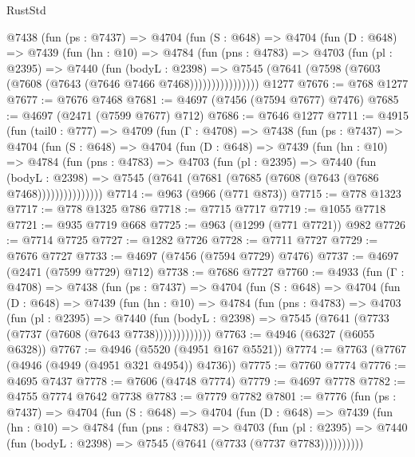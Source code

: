 \begin{lexlean}{RustStd}
\begin{coremodule}
        @7438
          (fun (ps : @7437) =>
          @4704
            (fun (S : @648) =>
            @4704
              (fun (D : @648) =>
              @7439
                (fun (hn : @10) =>
                @4784
                  (fun (pns : @4783) =>
                  @4703
                    (fun (pl : @2395) =>
                    @7440
                      (fun (bodyL : @2398) =>
                      @7545 (@7641 (@7598 (@7603 (@7608 (@7643 (@7646 @7466 @7468))))))))))))))))
    @1277
@7676 := @768 @1277
@7677 := @7676 @7468
@7681 := @4697 (@7456 (@7594 @7677) @7476)
@7685 := @4697 (@2471 (@7599 @7677) @712)
@7686 := @7646 @1277
@7711 := @4915
    (fun (tail0 : @777) =>
    @4709
      (fun (Γ : @4708) =>
      @7438
        (fun (ps : @7437) =>
        @4704
          (fun (S : @648) =>
          @4704
            (fun (D : @648) =>
            @7439
              (fun (hn : @10) =>
              @4784
                (fun (pns : @4783) =>
                @4703
                  (fun (pl : @2395) =>
                  @7440
                    (fun (bodyL : @2398) =>
                    @7545 (@7641 (@7681 (@7685 (@7608 (@7643 (@7686 @7468)))))))))))))))
@7714 := @963 (@966 (@771 @873))
@7715 := @778 @1323
@7717 := @778 @1325 @786
@7718 := @7715 @7717
@7719 := @1055 @7718
@7721 := @935 @7719 @668
@7725 := @963 (@1299 (@771 @7721)) @982
@7726 := @7714 @7725
@7727 := @1282 @7726
@7728 := @7711 @7727
@7729 := @7676 @7727
@7733 := @4697 (@7456 (@7594 @7729) @7476)
@7737 := @4697 (@2471 (@7599 @7729) @712)
@7738 := @7686 @7727
@7760 := @4933
    (fun (Γ : @4708) =>
    @7438
      (fun (ps : @7437) =>
      @4704
        (fun (S : @648) =>
        @4704
          (fun (D : @648) =>
          @7439
            (fun (hn : @10) =>
            @4784
              (fun (pns : @4783) =>
              @4703
                (fun (pl : @2395) =>
                @7440
                  (fun (bodyL : @2398) =>
                  @7545 (@7641 (@7733 (@7737 (@7608 (@7643 @7738)))))))))))))
@7763 := @4946 (@6327 (@6055 @6328))
@7767 := @4946 (@5520 (@4951 @167 @5521))
@7774 := @7763 (@7767 (@4946 (@4949 (@4951 @321 @4954)) @4736))
@7775 := @7760 @7774
@7776 := @4695 @7437
@7778 := @7606 (@4748 @7774)
@7779 := @4697 @7778
@7782 := @4755 @7774 @7642 @7738
@7783 := @7779 @7782
@7801 := @7776
    (fun (ps : @7437) =>
    @4704
      (fun (S : @648) =>
      @4704
        (fun (D : @648) =>
        @7439
          (fun (hn : @10) =>
          @4784
            (fun (pns : @4783) =>
            @4703
              (fun (pl : @2395) =>
              @7440 (fun (bodyL : @2398) => @7545 (@7641 (@7733 (@7737 @7783))))))))))

\end{coremodule}
\end{lexlean}
